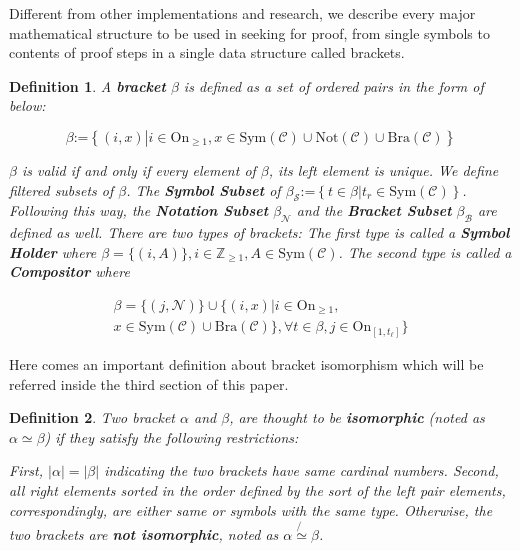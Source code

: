 \documentclass{aims}
\numberwithin{equation}{section}
\newtheorem{definition}{Definition}	%
\numberwithin{theorem}{section}	%
\numberwithin{axiom}{section}	%
\numberwithin{definition}{section}	%
\begin{document}
	Different from other implementations and research, we describe every major mathematical structure to be used in seeking for proof, from single symbols to contents of proof steps in a single data structure called brackets.
	
	\begin{definition}
		A \textbf{ bracket} \(\beta\) is defined as a set of ordered pairs in the form of below:
		
		\begin{equation}
			\beta \text{:=}\left\{(i,x)\left|i\in \text{On}_{\geq 1}\right.,x\in \text{Sym}(\mathcal{C})\cup \text{Not}(\mathcal{C})\cup \text{Bra}(\mathcal{C})\right\}
		\end{equation}
		
		\(\beta\) is valid if and only if every element of \(\beta\), its left element is unique. We define filtered subsets of \(\beta\). The \textbf{ Symbol Subset} of \(\beta _{\mathcal{S}}\text{:=}\left\{t\in \beta \left|t_{\mathit{r}}\in \text{Sym}(\mathcal{C})\right.\right\}\). Following this way, the \textbf{ Notation Subset} \(\beta _{\mathcal{N}}\) and the \textbf{ Bracket Subset} \(\beta _{\mathcal{B}}\) are defined as well. There are two types of brackets: The first type is called a \textbf{ Symbol Holder} where \(\beta =\{(i,A)\},i\in \mathbb{Z}_{\geq 1},A\in \text{Sym}(\mathcal{C})\). The second type is called a \textbf{ Compositor} where
		
		\begin{equation}
			\begin{split}
				\beta =\{(j,\mathcal{N})\}\cup \{(i,x)|i\in \text{On}_{\geq 1},\\ x\in \text{Sym}(\mathcal{C})\cup \text{Bra}(\mathcal{C})\},\forall
				t\in \beta ,j\in \text{On}_{[1,t_{\ell }]}\}
			\end{split}
		\end{equation}
	\end{definition}
	
	Here comes an important definition about bracket isomorphism which will be referred inside the third section of this paper.
	
	\begin{definition}
		Two bracket \(\alpha\) and \(\beta\), are thought to be \textbf{ isomorphic} (noted as \(\alpha \simeq \beta\)) if they satisfy the following restrictions:
		
		First, \(|\alpha |=|\beta |\) indicating the two brackets have same cardinal numbers. Second, all right elements sorted in the order defined by the sort of the left pair elements, correspondingly, are either same or symbols with the same type. Otherwise, the two brackets are \textbf{ not isomorphic}, noted as \(\alpha \not{\simeq}\beta\).
	\end{definition}
	
\end{document}
